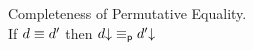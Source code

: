 \begin{conjecture}{Completeness of Permutative Equality.}\\ \label{thm:permutative-completeness}
If $d \equiv d'$ then $d\mathord{\downarrow} \equiv_{\mathsf{p}} d'\mathord{\downarrow}$
\end{conjecture}

